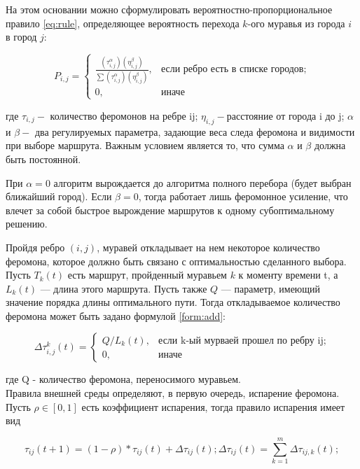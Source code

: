 На этом основании можно сформулировать вероятностно-пропорциональное правило \ref{eq:rule}, определяющее вероятность перехода $k$-ого муравья из города $i$ в город $j$:

\begin{equation}
	\label{eq:rule}
	P_{i,j}={\begin{cases}{\frac {(\tau_{i,j}^{\alpha })(\eta_{i,j}^{\beta })}{\sum (\tau_{i,j}^{\alpha })(\eta_{i,j}^{\beta })}}, & {\mbox{если ребро есть в списке городов;}}\\0,&{\mbox{иначе}}\end{cases}}
\end{equation}

\noindent где $ \tau_{i,j} - $ количество феромонов на ребре ij; $\eta_{i,j} - $расстояние от города i до j; $\alpha $ и $\beta - $ два регулируемых параметра, задающие веса следа феромона и видимости при выборе маршрута. Важным условием является то, что сумма $\alpha $ и $\beta $ должна быть постоянной.


При $\alpha=0$ алгоритм вырождается до алгоритма полного перебора (будет выбран ближайший город). Если $\beta=0$, тогда работает лишь феромонное усиление, что влечет за собой быстрое вырождение маршрутов к одному субоптимальному решению.


Пройдя ребро $(i,j)$, муравей откладывает на нем некоторое количество феромона, которое должно быть связано с оптимальностью сделанного выбора. Пусть $T_k(t)$ есть маршрут, пройденный муравьем $k$ к моменту времени t, а $L_k(t)$ --- длина этого маршрута. Пусть также $Q$ --- параметр, имеющий значение порядка длины оптимального пути. Тогда откладываемое количество феромона может быть задано формулой \ref{form:add}:

\begin{equation}\label{form:add}
	{\displaystyle \Delta \tau_{i,j}^k(t)={\begin{cases}Q/L_{k}(t), & {\mbox{если k-ый мурваей прошел по ребру ij;}}\\0,&{\mbox{иначе}}\end{cases}}}
\end{equation}

\noindent где Q - количество феромона, переносимого муравьем.\\

Правила внешней среды определяют, в первую очередь, испарение феромона. Пусть $\rho \in [0,1]$ есть коэффициент испарения, тогда правило испарения имеет вид

\begin{equation}
	\label{eq:pheromone_evaporation}
	\tau_{ij}(t+1) = (1 - \rho) * \tau_{ij}(t) + \Delta\tau_{ij}(t); \Delta\tau_{ij}(t) = \sum_{k = 1}^{m} \Delta\tau_{ij,k}(t); 
\end{equation}

